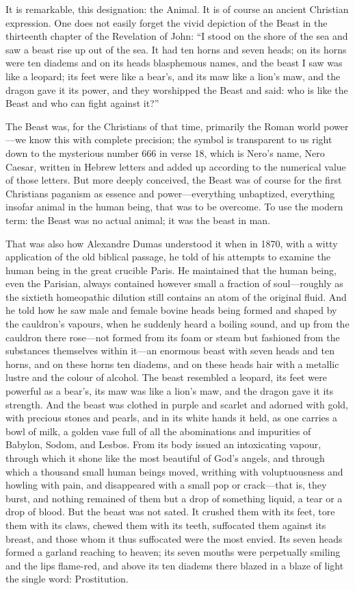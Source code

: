 \documentclass[12pt,a4paper]{article}
\begin{document}
It is remarkable, this designation: the Animal. It is of course an
ancient Christian expression. One does not easily forget the vivid
depiction of the Beast in the thirteenth chapter of the Revelation of
John: ``I stood on the shore of the sea and saw a beast rise up out
of the sea. It had ten horns and seven heads; on its horns were ten
diadems and on its heads blasphemous names, and the beast I saw was
like a leopard; its feet were like a bear's, and its maw like a lion's
maw, and the dragon gave it its power, and they worshipped the Beast
and said: who is like the Beast and who can fight against it?''

The Beast was, for the Christians of that time, primarily the Roman
world power---we know this with complete precision; the symbol is
transparent to us right down to the mysterious number 666 in verse 18,
which is Nero's name, Nero Caesar, written in Hebrew letters and added
up according to the numerical value of those letters. But more deeply
conceived, the Beast was of course for the first Christians paganism
as essence and power---everything unbaptized, everything insofar
animal in the human being, that was to be overcome. To use the modern
term: the Beast was no actual animal; it was the beast in man.

That was also how Alexandre Dumas understood it when in 1870, with a
witty application of the old biblical passage, he told of his attempts
to examine the human being in the great crucible Paris. He maintained
that the human being, even the Parisian, always contained however
small a fraction of soul---roughly as the sixtieth homeopathic dilution
still contains an atom of the original fluid. And he told how he saw
male and female bovine heads being formed and shaped by the cauldron's
vapours, when he suddenly heard a boiling sound, and up from the
cauldron there rose---not formed from its foam or steam but fashioned
from the substances themselves within it---an enormous beast with
seven heads and ten horns, and on these horns ten diadems, and on
these heads hair with a metallic lustre and the colour of alcohol. The
beast resembled a leopard, its feet were powerful as a bear's, its
maw was like a lion's maw, and the dragon gave it its strength. And
the beast was clothed in purple and scarlet and adorned with gold,
with precious stones and pearls, and in its white hands it held, as
one carries a bowl of milk, a golden vase full of all the abominations
and impurities of Babylon, Sodom, and Lesbos. From its body issued an
intoxicating vapour, through which it shone like the most beautiful of
God's angels, and through which a thousand small human beings moved,
writhing with voluptuousness and howling with pain, and disappeared
with a small pop or crack---that is, they burst, and nothing remained
of them but a drop of something liquid, a tear or a drop of blood.
But the beast was not sated. It crushed them with its feet, tore them
with its claws, chewed them with its teeth, suffocated them against
its breast, and those whom it thus suffocated were the most envied.
Its seven heads formed a garland reaching to heaven; its seven mouths
were perpetually smiling and the lips flame-red, and above its ten
diadems there blazed in a blaze of light the single word: Prostitution.
\end{document}
